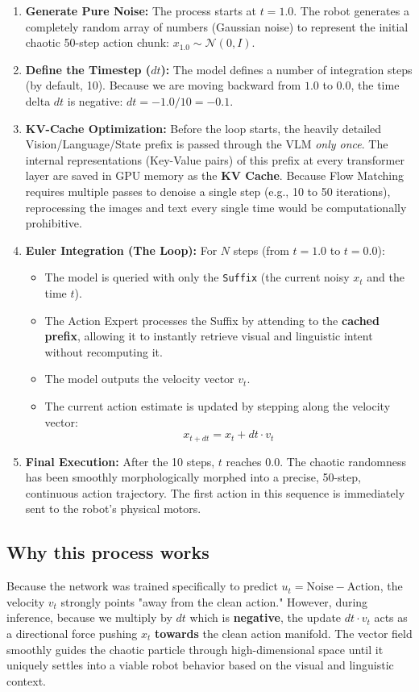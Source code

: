 \documentclass[11pt,a4paper]{article}
\begin{document}
\begin{enumerate}
    \item \textbf{Generate Pure Noise:} The process starts at $t=1.0$. The robot generates a completely random array of numbers (Gaussian noise) to represent the initial chaotic 50-step action chunk: $x_{1.0} \sim \mathcal{N}(0, I)$.
    \item \textbf{Define the Timestep ($dt$):} The model defines a number of integration steps (by default, 10). Because we are moving backward from $1.0$ to $0.0$, the time delta $dt$ is negative: $dt = -1.0 / 10 = -0.1$.
    \item \textbf{KV-Cache Optimization:} Before the loop starts, the heavily detailed Vision/Language/State prefix is passed through the VLM \textit{only once}. The internal representations (Key-Value pairs) of this prefix at every transformer layer are saved in GPU memory as the \textbf{KV Cache}. Because Flow Matching requires multiple passes to denoise a single step (e.g., 10 to 50 iterations), reprocessing the images and text every single time would be computationally prohibitive.
    \item \textbf{Euler Integration (The Loop):} For $N$ steps (from $t=1.0$ to $t=0.0$):
    \begin{itemize}
        \item The model is queried with only the \texttt{Suffix} (the current noisy $x_t$ and the time $t$).
        \item The Action Expert processes the Suffix by attending to the \textbf{cached prefix}, allowing it to instantly retrieve visual and linguistic intent without recomputing it.
        \item The model outputs the velocity vector $v_t$.
        \item The current action estimate is updated by stepping along the velocity vector:
        \[ x_{t+dt} = x_t + dt \cdot v_t \]
    \end{itemize}
    \item \textbf{Final Execution:} After the 10 steps, $t$ reaches $0.0$. The chaotic randomness has been smoothly morphologically morphed into a precise, 50-step, continuous action trajectory. The first action in this sequence is immediately sent to the robot's physical motors.
\end{enumerate}

\subsection{Why this process works}
Because the network was trained specifically to predict $u_t = \text{Noise} - \text{Action}$, the velocity $v_t$ strongly points "away from the clean action." However, during inference, because we multiply by $dt$ which is \textbf{negative}, the update $dt \cdot v_t$ acts as a directional force pushing $x_t$ \textbf{towards} the clean action manifold. The vector field smoothly guides the chaotic particle through high-dimensional space until it uniquely settles into a viable robot behavior based on the visual and linguistic context.
\end{document}
